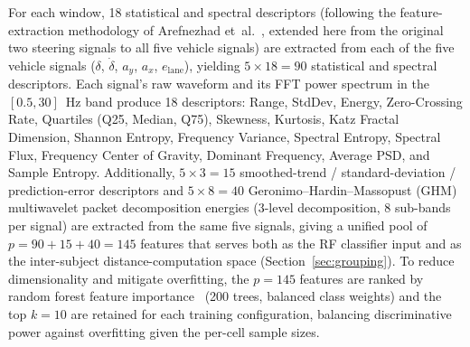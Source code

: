 \documentclass[lettersize,journal]{IEEEtran}
\begin{document}
For each window, 18 statistical and spectral descriptors (following the feature-extraction methodology of Arefnezhad et~al.~\cite{arefnezhad2019}, extended here from the original two steering signals to all five vehicle signals) are extracted from each of the five vehicle signals ($\delta$, $\dot{\delta}$, $a_y$, $a_x$, $e_{\text{lane}}$), yielding $5 \times 18 = 90$ statistical and spectral descriptors.
Each signal's raw waveform and its FFT power spectrum in the $[0.5, 30]$~Hz band produce 18 descriptors: Range, StdDev, Energy, Zero-Crossing Rate, Quartiles (Q25, Median, Q75), Skewness, Kurtosis, Katz Fractal Dimension, Shannon Entropy, Frequency Variance, Spectral Entropy, Spectral Flux, Frequency Center of Gravity, Dominant Frequency, Average PSD, and Sample Entropy.
Additionally, $5 \times 3 = 15$ smoothed-trend / standard-deviation / prediction-error descriptors and $5 \times 8 = 40$ Geronimo--Hardin--Massopust (GHM) multiwavelet packet decomposition energies (3-level decomposition, 8 sub-bands per signal) are extracted from the same five signals, giving a unified pool of $p = 90 + 15 + 40 = 145$ features that serves both as the RF classifier input and as the inter-subject distance-computation space (Section~\ref{sec:grouping}).
To reduce dimensionality and mitigate overfitting, the $p = 145$ features are ranked by random forest feature importance~\cite{breiman2001} (200 trees, balanced class weights) and the top $k = 10$ are retained for each training configuration, balancing discriminative power against overfitting given the per-cell sample sizes.
\end{document}
